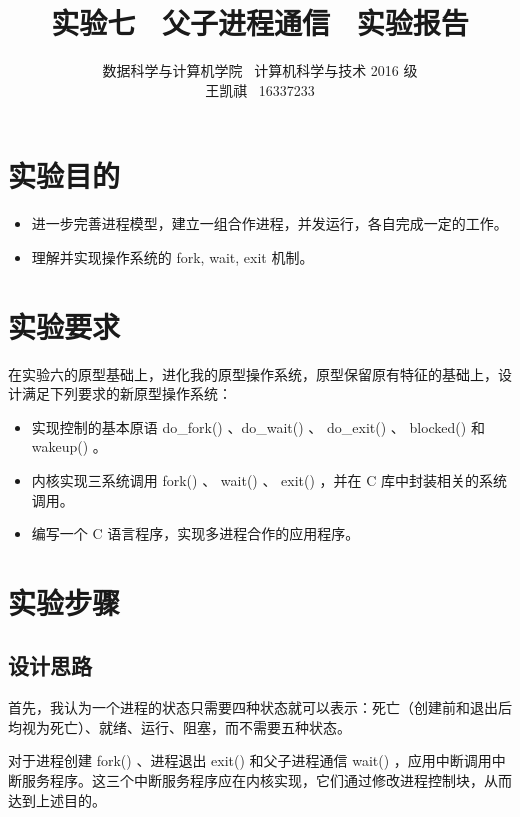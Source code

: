 \documentclass{article}
\begin{document}
\title{实验七 \ 父子进程通信 \ 实验报告}
\author {数据科学与计算机学院 \ 计算机科学与技术 2016 级 \\ 王凯祺 \ 16337233}
\maketitle

\section{实验目的}

\begin{itemize}
\item 进一步完善进程模型，建立一组合作进程，并发运行，各自完成一定的工作。
\item 理解并实现操作系统的 fork, wait, exit 机制。
\end{itemize}

\section{实验要求}

在实验六的原型基础上，进化我的原型操作系统，原型保留原有特征的基础上，设计满足下列要求的新原型操作系统：

\begin{itemize}
\item 实现控制的基本原语 do\_fork() 、do\_wait() 、 do\_exit() 、 blocked() 和 wakeup() 。
\item 内核实现三系统调用 fork() 、 wait() 、 exit() ，并在 C 库中封装相关的系统调用。
\item 编写一个 C 语言程序，实现多进程合作的应用程序。
\end{itemize}

\section{实验步骤}

\subsection{设计思路}

首先，我认为一个进程的状态只需要四种状态就可以表示：死亡（创建前和退出后均视为死亡）、就绪、运行、阻塞，而不需要五种状态。

对于进程创建 fork() 、进程退出 exit() 和父子进程通信 wait() ，应用中断调用中断服务程序。这三个中断服务程序应在内核实现，它们通过修改进程控制块，从而达到上述目的。
\end{document}
